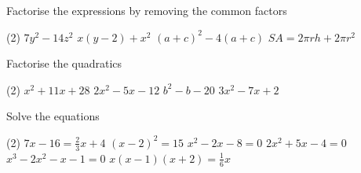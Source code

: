 \begin{Exercise}[title={Algebra Review},label=ex11]
\Question Factorise the expressions by removing the common factors
\begin{tasks}(2)
	\task 	$7y^2-14z^2$%
	\task  $x(y-2)+x^2$%
	\task $(a+c)^2-4(a+c)$%
	\task $SA=2\pi r h+2\pi r^2$%
\end{tasks}

\Question Factorise the quadratics
\begin{tasks}(2)
	\task $x^{2} +11 x +28$%
	\task $2 x^{2} -5 x -12$%
	\task $b^2-b-20$%
	\task $3x^2-7x+2$%
\end{tasks}

\Question Solve the equations
\begin{tasks}(2)
	\task 	 $7 x -16 =\frac{2}{3} x +4$ %
	\task   $\left (x -2\right )^{2} =15$%
	\task 	$x^{2} -2 x -8 =0$%
	\task   $2 x^{2} +5 x -4 =0$%
	\task	$x^{3} -2 x^{2} -x -1 =0$%
	\task	$x \left (x -1\right ) \left (x +2\right ) =\frac{1}{6} x$%
\end{tasks}
\end{Exercise}

